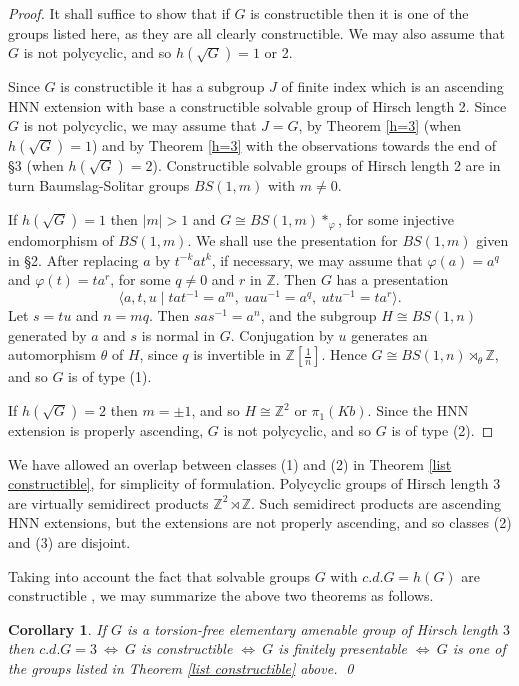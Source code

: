 \documentclass[12pt]{amsart}
\newtheorem{cor}[theorem]{Corollary}
\begin{document}
\begin{proof}
It shall suffice to show that if $G$ is constructible then it is one of the groups
listed here, as they are all clearly constructible.
We may also assume that $G$ is not polycyclic, 
and so $h(\sqrt{G})=1$ or 2.

Since $G$ is constructible it has a subgroup $J$
of finite index which is an ascending HNN extension with base 
a constructible solvable group of Hirsch length 2. 
Since $G$ is not polycyclic, we may assume that $J=G$, by Theorem \ref{h=3}
(when $h(\sqrt{G})=1$) and by Theorem \ref{h=3} with the observations 
towards the end of \S3 (when $h(\sqrt{G})=2$).
Constructible solvable groups of Hirsch length 2 are in turn Baumslag-Solitar 
groups $BS(1,m)$ with $m\not=0$.

If $h(\sqrt{G})=1$ then $|m|>1$ and $G\cong{BS(1,m)}*_\varphi$, 
for some injective endomorphism of $BS(1,m)$. 
We shall use the presentation for $BS(1,m)$ given in \S2. 
After replacing $a$ by $t^{-k}at^k$, if necessary,
we may assume that $\varphi(a)=a^q$ and $\varphi(t)=ta^r$, 
for some $q\not=0$ and $r$ in $\mathbb{Z}$.
Then $G$ has a presentation
\[
\langle{a,t,u}\mid {tat^{-1}=a^m},~uau^{-1}=a^q,~utu^{-1}=ta^r\rangle.
\]
Let $s=tu$ and $n=mq$. Then $sas^{-1}=a^n$, and 
the subgroup $H\cong{BS(1,n)}$ generated by $a$ and $s$ is normal in $G$.
Conjugation by $u$ generates an automorphism $\theta$ of $H$,
since $q$ is invertible in $\mathbb{Z}[\frac1n]$.
Hence $G\cong{BS(1,n)}\rtimes_\theta\mathbb{Z}$, and so $G$ is of type (1).

If $h(\sqrt{G})=2$ then $m=\pm1$,  and so 
$H\cong\mathbb{Z}^2$ or $\pi_1(Kb)$.
Since the HNN extension is properly ascending,
$G$ is not polycyclic, and so $G$ is of type (2).
\end{proof}

We have allowed an overlap between classes (1) and (2) 
in Theorem \ref{list constructible}, 
for simplicity of formulation.
Polycyclic groups of Hirsch length 3 
are virtually semidirect products $\mathbb{Z}^2\rtimes\mathbb{Z}$.
Such semidirect products are ascending HNN extensions, 
but the extensions are not properly ascending, 
and so classes (2) and (3) are disjoint.

Taking into account the fact that solvable groups $G$
with $c.d.G=h(G)$ are constructible \cite{Kr86},
we may summarize the above two theorems as follows.

\begin{cor}
If $G$ is a torsion-free elementary amenable group of
Hirsch length $3$ then $c.d.G=3~\Leftrightarrow~G$ is constructible
$\Leftrightarrow~G$ is finitely presentable $\Leftrightarrow~G$ is one 
of the groups listed in Theorem \ref{list constructible} above.
\qed
\end{cor}
\end{document}
